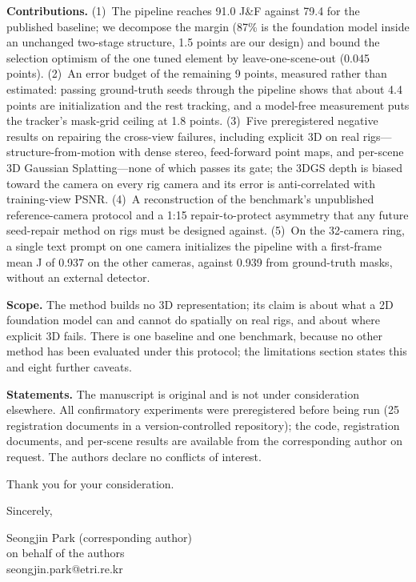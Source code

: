 \documentclass[11pt]{article}
\begin{document}
\textbf{Contributions.} (1)~The pipeline reaches 91.0 J\&F against 79.4 for the published baseline; we decompose the margin (87\% is the foundation model inside an unchanged two-stage structure, 1.5 points are our design) and bound the selection optimism of the one tuned element by leave-one-scene-out (0.045 points). (2)~An error budget of the remaining 9 points, measured rather than estimated: passing ground-truth seeds through the pipeline shows that about 4.4 points are initialization and the rest tracking, and a model-free measurement puts the tracker's mask-grid ceiling at 1.8 points. (3)~Five preregistered negative results on repairing the cross-view failures, including explicit 3D on real rigs---structure-from-motion with dense stereo, feed-forward point maps, and per-scene 3D Gaussian Splatting---none of which passes its gate; the 3DGS depth is biased toward the camera on every rig camera and its error is anti-correlated with training-view PSNR. (4)~A reconstruction of the benchmark's unpublished reference-camera protocol and a 1:15 repair-to-protect asymmetry that any future seed-repair method on rigs must be designed against. (5)~On the 32-camera ring, a single text prompt on one camera initializes the pipeline with a first-frame mean J of 0.937 on the other cameras, against 0.939 from ground-truth masks, without an external detector.

\textbf{Scope.} The method builds no 3D representation; its claim is about what a 2D foundation model can and cannot do spatially on real rigs, and about where explicit 3D fails. There is one baseline and one benchmark, because no other method has been evaluated under this protocol; the limitations section states this and eight further caveats.

\textbf{Statements.} The manuscript is original and is not under consideration elsewhere. All confirmatory experiments were preregistered before being run (25 registration documents in a version-controlled repository); the code, registration documents, and per-scene results are available from the corresponding author on request. The authors declare no conflicts of interest.

Thank you for your consideration.

Sincerely,

Seongjin Park (corresponding author)\\
on behalf of the authors\\
seongjin.park@etri.re.kr
\end{document}
